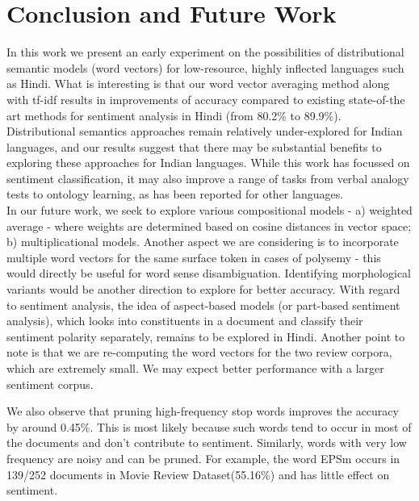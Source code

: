 \def\DevnagVersion{2.15}\documentclass[11pt]{article}
\begin{document}
\section{Conclusion and Future Work}
In this work we present an early experiment on the possibilities of distributional semantic models (word vectors) for low-resource, highly inflected languages such as Hindi.  What is interesting is that our word vector averaging method along with tf-idf results in improvements of accuracy compared to existing state-of-the art methods for sentiment analysis in Hindi (from 80.2\% to 89.9\%). \\
Distributional semantics approaches remain relatively under-explored for
Indian languages, and our results suggest that there may be substantial
benefits to exploring these approaches for Indian languages.  While this work
has focussed on sentiment classification, it may also improve a range of tasks from verbal analogy tests to ontology learning, as has been reported for other languages.   \\
In our future work, we seek to explore various compositional models - a) weighted average - where weights are determined based on cosine distances in vector space;  b) multiplicational models. Another aspect we are considering is to incorporate multiple word vectors for the same surface token in cases of polysemy - this would directly be useful for word sense disambiguation.  Identifying morphological variants would be another direction to explore for better accuracy. With regard to sentiment analysis, the idea of aspect-based models (or part-based sentiment analysis), which looks into constituents in a document and 
classify their sentiment polarity separately, remains to be explored in
Hindi.
Another point to note is that we are re-computing the word vectors
for the two review corpora, which are extremely small.  We may expect 
better performance  with a larger sentiment corpus.

We also observe that pruning high-frequency stop words improves the accuracy
by around 0.45\%. This is most likely  because such words tend to occur in
most of the documents and don't contribute to sentiment.  Similarly, words
with very low frequency are noisy and can be pruned.
For example, the word {\dn EPSm} occurs in 139/252 documents in Movie
Review Dataset(55.16\%) and has little effect on sentiment.
\end{document}
